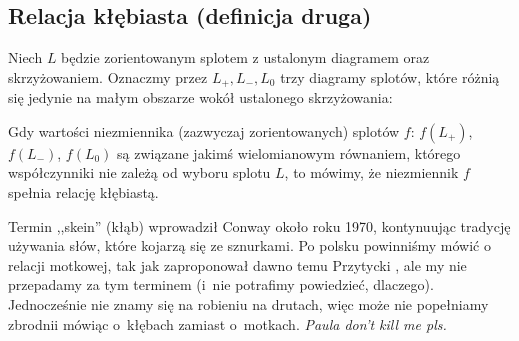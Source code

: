 
\subsection{Relacja kłębiasta (definicja druga)}

\begin{definition}
\label{skein_symbols}%
%
    Niech $L$ będzie zorientowanym splotem z ustalonym diagramem oraz skrzyżowaniem.
    Oznaczmy przez $L_+, L_-, L_0$ trzy diagramy splotów, które różnią się jedynie na małym obszarze wokół ustalonego skrzyżowania:
\begin{comment}
    \begin{figure}[H]
        \centering
        \begin{minipage}[b]{.3\linewidth}
            \centering
            \[\LargePlusCrossingArrows\]
            \subcaption{$L_+$}
        \end{minipage}
        \begin{minipage}[b]{.3\linewidth}
            \centering
            \[\LargeMinusCrossingArrows\]
            \subcaption{$L_-$}
        \end{minipage}
        \begin{minipage}[b]{.3\linewidth}
            \centering
            \[\LargeJustSmoothing\]
            \subcaption{$L_0$}
        \end{minipage}
    \end{figure}
\end{comment}
\noindent
Gdy wartości niezmiennika (zazwyczaj zorientowanych) splotów $f$: $f(L_+)$, $f(L_-)$, $f(L_0)$ są związane jakimś wielomianowym równaniem, którego współczynniki nie zależą od wyboru splotu $L$, to mówimy, że niezmiennik $f$ spełnia relację kłębiastą.
\end{definition}

Termin ,,skein'' (kłąb) wprowadził Conway około roku 1970, kontynuując tradycję używania słów, które kojarzą się ze sznurkami.
%
Po polsku powinniśmy mówić o relacji motkowej, tak jak zaproponował dawno temu Przytycki \cite[s. 172]{przytycki1995}, ale my nie przepadamy za tym terminem (i~nie potrafimy powiedzieć, dlaczego).
Jednocześnie nie znamy się na robieniu na drutach, więc może nie popełniamy zbrodnii mówiąc o~kłębach zamiast o~motkach.
\emph{Paula don't kill me pls.}

